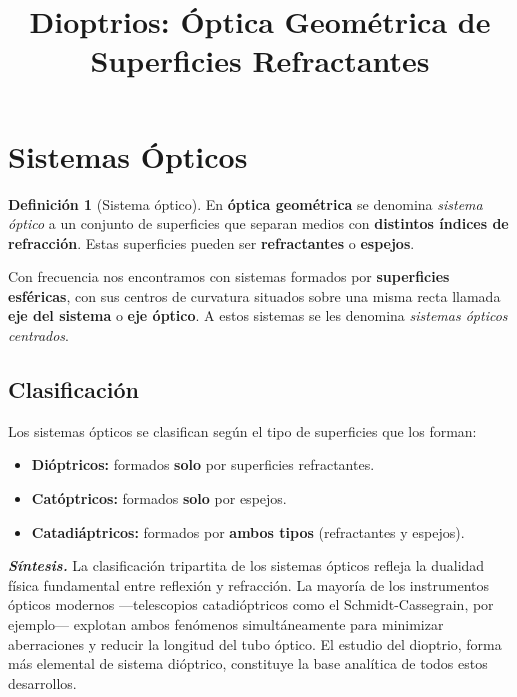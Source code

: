 \documentclass[12pt, a4paper]{article}
\title{\textbf{Dioptrios: Óptica Geométrica de Superficies Refractantes}}
\author{}
\date{}
\theoremstyle{definition}
\newtheorem{definicion}{Definición}[section]
\begin{document}
\maketitle
\thispagestyle{empty}
\tableofcontents
\newpage

\section{Sistemas Ópticos}

\begin{definicion}[Sistema óptico]
En \textbf{óptica geométrica} se denomina \textit{sistema óptico} a un conjunto de
superficies que separan medios con \textbf{distintos índices de refracción}. Estas
superficies pueden ser \textbf{refractantes} o \textbf{espejos}.
\end{definicion}

Con frecuencia nos encontramos con sistemas formados por \textbf{superficies esféricas},
con sus centros de curvatura situados sobre una misma recta llamada \textbf{eje del
sistema} o \textbf{eje óptico}. A estos sistemas se les denomina \textit{sistemas ópticos
centrados}.

\subsection*{Clasificación}

Los sistemas ópticos se clasifican según el tipo de superficies que los forman:

\begin{itemize}
  \item \textbf{Dióptricos:} formados \textbf{solo} por superficies refractantes.
  \item \textbf{Catóptricos:} formados \textbf{solo} por espejos.
  \item \textbf{Catadiáptricos:} formados por \textbf{ambos tipos} (refractantes y espejos).
\end{itemize}

\textit{\textbf{Síntesis.}} La clasificación tripartita de los sistemas ópticos refleja la
dualidad física fundamental entre reflexión y refracción. La mayoría de los instrumentos
ópticos modernos —telescopios catadióptricos como el Schmidt-Cassegrain, por ejemplo—
explotan ambos fenómenos simultáneamente para minimizar aberraciones y reducir la longitud
del tubo óptico. El estudio del dioptrio, forma más elemental de sistema dióptrico,
constituye la base analítica de todos estos desarrollos.
\end{document}
